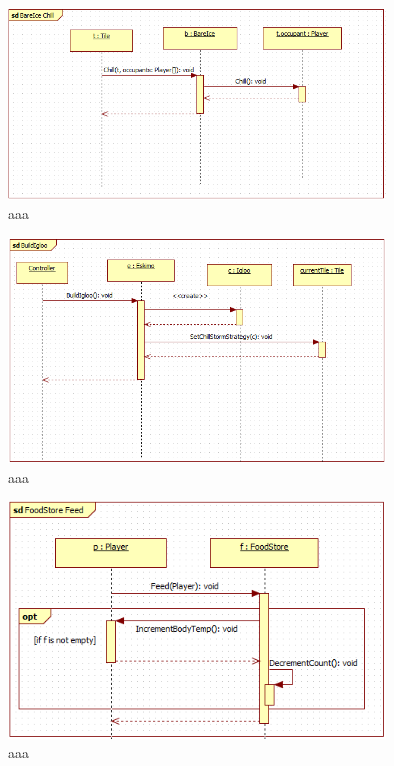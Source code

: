 \begin{figure}[H]
	\begin{center}
		\includegraphics[width=10cm]{chapters/chapter03/seqdiag/BareIce_Chill.png}
		\caption{aaa}
		\label{bbb}
	\end{center}
\end{figure}
\begin{figure}[H]
	\begin{center}
		\includegraphics[width=10cm]{chapters/chapter03/seqdiag/Eskimo_BuildIgloo.png}
		\caption{aaa}
		\label{bbb}
	\end{center}
\end{figure}
\begin{figure}[H]
	\begin{center}
		\includegraphics[width=10cm]{chapters/chapter03/seqdiag/FoodStore_Feed.png}
		\caption{aaa}
		\label{bbb}
	\end{center}
\end{figure}

